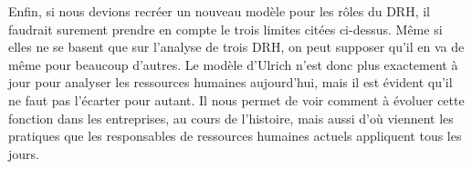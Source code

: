 
Enfin, si nous devions recréer un nouveau modèle pour les rôles du DRH, il faudrait surement prendre en compte le trois limites citées ci-dessus. Même si elles ne se basent que sur l'analyse de trois DRH, on peut supposer qu'il en va de même pour beaucoup d'autres. Le modèle d'Ulrich n'est donc plus exactement à jour pour analyser les ressources humaines aujourd'hui, mais il est évident qu'il ne faut pas l'écarter pour autant. Il nous permet de voir comment à évoluer cette fonction dans les entreprises, au cours de l'histoire, mais aussi d'où viennent les pratiques que les responsables de ressources humaines actuels appliquent tous les jours. \\
